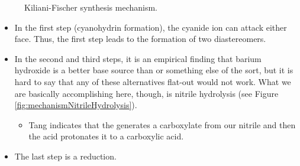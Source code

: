 \documentclass[../notes.tex]{subfiles}
\begin{document}
\begin{itemize}
\begin{figure}[H]
        \chemnameinit{}
        \caption{Kiliani-Fischer synthesis mechanism.}
        \label{fig:mechanismKilianiFischer}
    \end{figure}
    \begin{itemize}
        \item In the first step (cyanohydrin formation), the cyanide ion can attack either face. Thus, the first step leads to the formation of two diastereomers.
        \item In the second and third steps, it is an empirical finding that barium hydroxide is a better base source than  or something else of the sort, but it is hard to say that any of these alternatives flat-out would not work. What we are basically accomplishing here, though, is nitrile hydrolysis (see Figure \ref{fig:mechanismNitrileHydrolysis}).
        \begin{itemize}
            \item Tang indicates that the  generates a carboxylate from our nitrile and then the acid protonates it to a carboxylic acid.
        \end{itemize}
        \item The last step is a reduction.
    \end{itemize}
\end{itemize}
\end{document}
